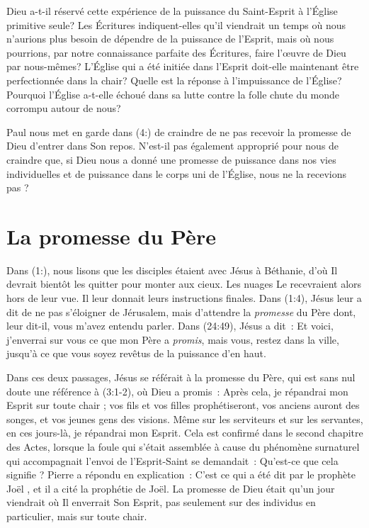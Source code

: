 \begin{specialpar}{}
Dieu a-t-il réservé cette expérience de la puissance du Saint-Esprit à
 l'Église primitive seule? Les Écritures indiquent-elles qu'il viendrait
 un temps où nous n'aurions plus besoin de dépendre de la puissance
 de l'Esprit, mais où nous pourrions, par notre connaissance parfaite
 des Écritures, faire l'œuvre de Dieu par nous-mêmes? L'Église qui a été
 initiée dans l'Esprit doit-elle maintenant être perfectionnée dans
 la chair?
 Quelle est la réponse à l'impuissance de l'Église?
 Pourquoi l'Église a-t-elle échoué dans sa lutte contre la folle chute
 du monde corrompu autour de nous?
\end{specialpar}

Paul nous met en garde dans (4:) de craindre de ne pas
 recevoir la promesse de Dieu d'entrer dans Son repos.
 N'est-il pas également approprié pour nous de craindre que, si Dieu
 nous a donné une promesse de puissance dans nos vies individuelles et de
 puissance dans le corps uni de l'Église, nous ne la recevions pas ?


\section{La promesse du Père}

Dans (1:), nous lisons que les disciples étaient avec
 Jésus à Béthanie, d'où Il devrait bientôt les quitter pour monter
 aux cieux.
 Les nuages Le recevraient alors hors de leur vue.
 Il leur donnait leurs instructions finales.
 Dans (1:4), Jésus leur a dit de \og ne pas s'éloigner
 de Jérusalem, mais d'attendre la \emph{promesse} du Père dont, leur dit-il,
 vous m'avez entendu parler. \fg{}
 Dans (24:49), Jésus a dit~:
 \og Et voici, j'enverrai sur vous ce que mon Père a \emph{promis}, mais vous,
 restez dans la ville, jusqu'à ce que vous soyez revêtus de la puissance
 d'en haut.\fg{}

Dans ces deux passages, Jésus se référait à la promesse du Père, qui est
 sans nul doute une référence à (3:1-2), où Dieu a promis~:
 \og Après cela, je répandrai mon Esprit sur toute chair ;
 vos fils et vos filles prophétiseront, vos anciens auront des songes,
 et vos jeunes gens des visions.
 Même sur les serviteurs et sur les servantes,
 en ces jours-là, je répandrai mon Esprit. \fg{}
 Cela est confirmé dans le second chapitre des Actes, lorsque la foule qui
 s'était assemblée à cause du phénomène surnaturel qui accompagnait l'envoi
 de l'Esprit-Saint se demandait~:
 \og Qu'est-ce que cela signifie ? \fg{}
 Pierre a répondu en explication~:
 \og C'est ce qui a été dit par le prophète Joël \fg{},
 et il a cité la prophétie de Joël.
 La promesse de Dieu était qu'un jour viendrait où Il enverrait Son Esprit,
 pas seulement sur des individus en particulier, mais sur toute chair.

